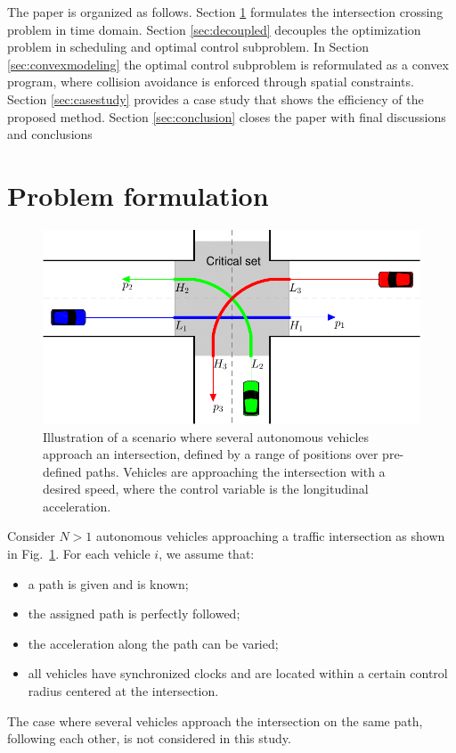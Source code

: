 \documentclass[letterpaper,10pt,conference]{ieeeconf}
\newlength \figwidth
\begin{document}
The paper is organized as follows. Section \ref{sec:problemstatement} formulates the intersection crossing problem in time domain. Section \ref{sec:decoupled} decouples the optimization problem in scheduling and optimal control subproblem. In Section \ref{sec:convexmodeling} the optimal control subproblem is reformulated as a convex program, where collision avoidance is enforced through spatial constraints. Section \ref{sec:casestudy} provides a case study that shows the efficiency of the proposed method.  Section \ref{sec:conclusion} closes the  paper with final discussions and conclusions

\section{Problem formulation} \label{sec:problemstatement}

\begin{figure}[t]
\centering
\includegraphics[width=\figwidth]{figures//intersection}
\caption{Illustration of a scenario where several autonomous vehicles approach an intersection, defined by a range of positions over pre-defined paths. Vehicles are approaching the intersection with a desired speed, where the control variable is the longitudinal acceleration.}
\label{fig:setup}
\end{figure}

Consider $N > 1$ autonomous vehicles approaching a traffic intersection as shown in Fig.~\ref{fig:setup}. For each vehicle $i$, we assume that:
 \begin{itemize}
 \item a path is given and is known;
 \item the assigned path is perfectly followed;
\item the acceleration along the path can be varied;
\item all vehicles have synchronized clocks and are located within a certain control radius centered at the intersection.
 \end{itemize}
The case where several vehicles approach the intersection on the same path, following each other, is not considered in this study.
\end{document}

